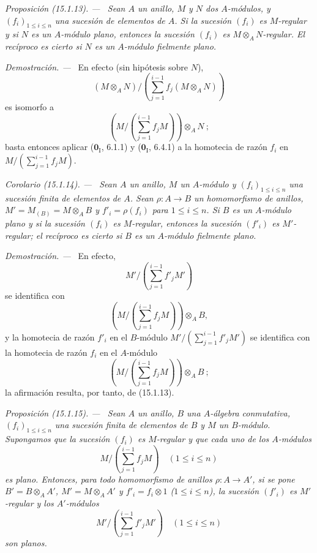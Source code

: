 \documentclass[10pt,oneside]{book}
\makeatletter
\newcommand{\setmanualcurrentlabel}[1]{\def\@currentlabel{#1}}
\newenvironment{proposition}[1][]{%
  \setmanualcurrentlabel{#1}\par\medskip\noindent\itshape Proposición (#1). ---\ }{\par}
\newenvironment{corollary}[1][]{%
  \setmanualcurrentlabel{#1}\par\medskip\noindent\itshape Corolario (#1). ---\ }{\par}
\newenvironment{proof}{%
  \par\medskip\noindent\textit{Demostración. ---\ }}{\par}
\makeatother
\begin{document}
\begin{proposition}[15.1.13]
\label{0.15.1.13-es}
Sean $A$ un anillo, $M$ y $N$ dos $A$-módulos, y
$(f_i)_{1\leq i\leq n}$ una sucesión de elementos de $A$. Si la sucesión
$(f_i)$ es $M$-regular y si $N$ es un $A$-módulo plano, entonces la sucesión
$(f_i)$ es $M\otimes_A N$-regular. El recíproco es cierto si $N$ es un
$A$-módulo fielmente plano.
\end{proposition}

\begin{proof}
En efecto (sin hipótesis sobre $N$),
\[
  (M\otimes_A N)/
  \left(\sum_{j=1}^{i-1}f_j(M\otimes_A N)\right)
\]
es isomorfo a
\[
  \left(M/\left(\sum_{j=1}^{i-1}f_jM\right)\right)\otimes_A N~;
\]
basta entonces aplicar ($\mathbf{0}_{\mathrm I}$, 6.1.1) y
($\mathbf{0}_{\mathrm I}$, 6.4.1) a la homotecia de razón $f_i$ en
$M/(\sum_{j=1}^{i-1}f_jM)$.
\end{proof}

\begin{corollary}[15.1.14]
\label{0.15.1.14-es}
Sean $A$ un anillo, $M$ un $A$-módulo y $(f_i)_{1\leq i\leq n}$ una sucesión
finita de elementos de $A$. Sean $\rho:A\to B$ un homomorfismo de anillos,
$M'=M_{(B)}=M\otimes_A B$ y $f'_i=\rho(f_i)$ para $1\leq i\leq n$. Si $B$ es
un $A$-módulo plano y si la sucesión $(f_i)$ es $M$-regular, entonces la
sucesión $(f'_i)$ es $M'$-regular; el recíproco es cierto si $B$ es un
$A$-módulo fielmente plano.
\end{corollary}

\begin{proof}
En efecto,
\[
  M'/\left(\sum_{j=1}^{i-1}f'_jM'\right)
\]
se identifica con
\[
  \left(M/\left(\sum_{j=1}^{i-1}f_jM\right)\right)\otimes_A B,
\]
y la homotecia de razón $f'_i$ en el $B$-módulo
$M'/(\sum_{j=1}^{i-1}f'_jM')$ se identifica con la homotecia de razón $f_i$
en el $A$-módulo
\[
  \left(M/\left(\sum_{j=1}^{i-1}f_jM\right)\right)\otimes_A B~;
\]
la afirmación resulta, por tanto, de (15.1.13).
\end{proof}

\begin{proposition}[15.1.15]
\label{0.15.1.15-es}
Sean $A$ un anillo, $B$ una $A$-álgebra conmutativa,
$(f_i)_{1\leq i\leq n}$ una sucesión finita de elementos de $B$ y $M$ un
$B$-módulo. Supongamos que la sucesión $(f_i)$ es $M$-regular y que cada uno
de los $A$-módulos
\[
  M/\left(\sum_{j=1}^{i-1}f_jM\right)\quad(1\leq i\leq n)
\]
es plano. Entonces, para todo homomorfismo de anillos $\rho:A\to A'$, si se
pone $B'=B\otimes_A A'$, $M'=M\otimes_A A'$ y $f'_i=f_i\otimes1$
\textup{($1\leq i\leq n$)}, la sucesión $(f'_i)$ es $M'$-regular y los
$A'$-módulos
\[
  M'/\left(\sum_{j=1}^{i-1}f'_jM'\right)\quad(1\leq i\leq n)
\]
son planos.
\end{proposition}
\end{document}

